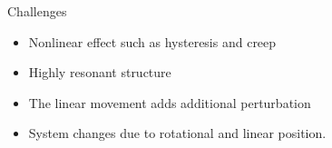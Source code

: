 \documentclass[10pt]{beamer}
\begin{document}
\begin{frame}[fragile]{Challenges}
  \begin{itemize}
    \item Nonlinear effect such as hysteresis and creep
    \item Highly resonant structure
    \item The linear movement adds additional perturbation
    \item System changes due to rotational and linear position.
  \end{itemize}
  \vspace{-0.7cm}
  \begin{figure}[h]
    \centering %
    \qquad
  \end{figure}
\end{frame}
\end{document}
